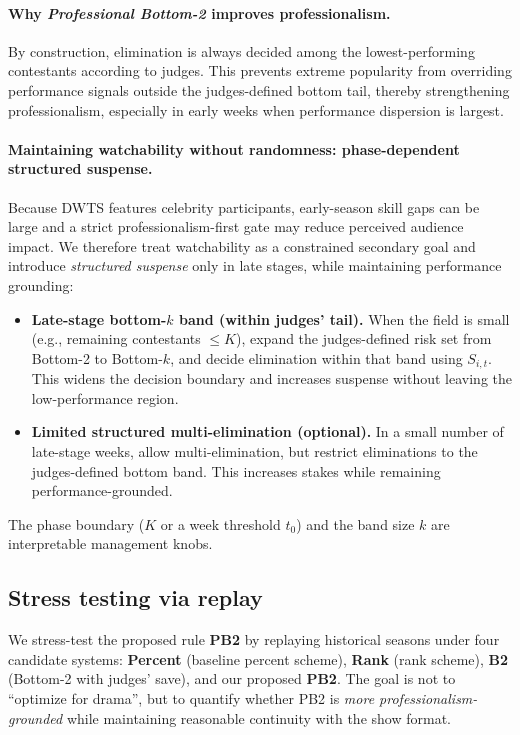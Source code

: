 \paragraph{Why \textit{Professional Bottom-2} improves professionalism.}
By construction, elimination is always decided among the lowest-performing contestants according to judges.
This prevents extreme popularity from overriding performance signals outside the judges-defined bottom tail,
thereby strengthening professionalism, especially in early weeks when performance dispersion is largest.

\paragraph{Maintaining watchability without randomness: phase-dependent structured suspense.}
Because DWTS features celebrity participants, early-season skill gaps can be large and a strict professionalism-first gate may reduce
perceived audience impact. We therefore treat watchability as a constrained secondary goal and introduce \emph{structured suspense} only in late stages,
while maintaining performance grounding:
\begin{itemize}
  \item \textbf{Late-stage bottom-$k$ band (within judges' tail).}
  When the field is small (e.g., remaining contestants $\le K$), expand the judges-defined risk set from Bottom-2 to Bottom-$k$,
  and decide elimination within that band using $S_{i,t}$. This widens the decision boundary and increases suspense without leaving the low-performance region.
  \item \textbf{Limited structured multi-elimination (optional).}
  In a small number of late-stage weeks, allow multi-elimination, but restrict eliminations to the judges-defined bottom band.
  This increases stakes while remaining performance-grounded.
\end{itemize}
The phase boundary ($K$ or a week threshold $t_0$) and the band size $k$ are interpretable management knobs.


\subsection{Stress testing via replay}
\label{subsubsec:d2_stress}

We stress-test the proposed rule \textbf{PB2} by replaying historical seasons under four candidate systems:
\textbf{Percent} (baseline percent scheme), \textbf{Rank} (rank scheme), \textbf{B2} (Bottom-2 with judges' save),
and our proposed \textbf{PB2}. The goal is not to ``optimize for drama'', but to quantify whether PB2 is
\emph{more professionalism-grounded} while maintaining reasonable continuity with the show format.

